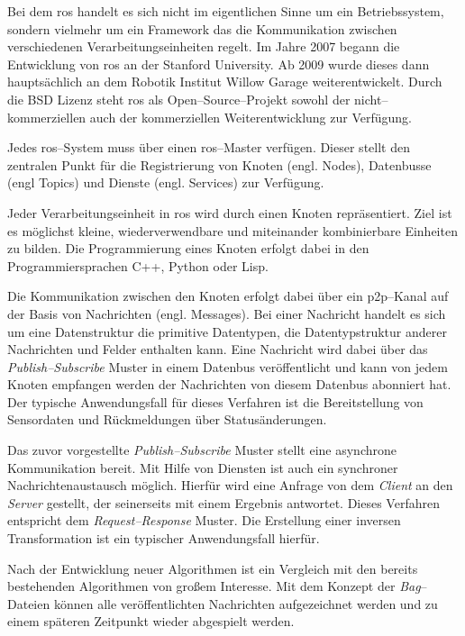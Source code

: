 Bei dem \Gls{ros} handelt es sich nicht im eigentlichen Sinne um ein Betriebssystem, sondern vielmehr um ein Framework das die Kommunikation zwischen verschiedenen Verarbeitungseinheiten regelt. Im Jahre 2007 begann die Entwicklung von \Gls{ros} an der Stanford University. Ab 2009 wurde dieses dann hauptsächlich an dem Robotik Institut Willow Garage weiterentwickelt. Durch die BSD Lizenz steht \Gls{ros} als Open--Source--Projekt sowohl der nicht--kommerziellen auch der kommerziellen Weiterentwicklung zur Verfügung. \cite{quigley2009ros}

Jedes \Gls{ros}--System muss über einen \Gls{ros}--Master verfügen. Dieser stellt den zentralen Punkt für die Registrierung von Knoten (engl. Nodes), Datenbusse (engl Topics) und Dienste (engl. Services) zur Verfügung.

Jeder Verarbeitungseinheit in \Gls{ros} wird durch einen Knoten repräsentiert. Ziel ist es möglichst kleine, wiederverwendbare und miteinander kombinierbare Einheiten zu bilden. Die Programmierung eines Knoten erfolgt dabei in den Programmiersprachen C++, Python oder Lisp.

Die Kommunikation zwischen den Knoten erfolgt dabei über ein \Gls{p2p}--Kanal auf der Basis von Nachrichten (engl. Messages). Bei einer Nachricht handelt es sich um eine Datenstruktur die primitive Datentypen, die Datentypstruktur anderer Nachrichten und Felder enthalten kann. Eine Nachricht wird dabei über das \textit{Publish--Subscribe} Muster in einem Datenbus veröffentlicht und kann von jedem Knoten empfangen werden der Nachrichten von diesem Datenbus abonniert hat. Der typische Anwendungsfall für dieses Verfahren ist die Bereitstellung von Sensordaten und Rückmeldungen über Statusänderungen.

Das zuvor vorgestellte \textit{Publish--Subscribe} Muster stellt eine asynchrone Kommunikation bereit. Mit Hilfe von Diensten ist auch ein synchroner Nachrichtenaustausch möglich. Hierfür wird eine Anfrage von dem \textit{Client} an den \textit{Server} gestellt, der seinerseits mit einem Ergebnis antwortet. Dieses Verfahren entspricht dem \textit{Request--Response} Muster. Die Erstellung einer inversen Transformation ist ein typischer Anwendungsfall hierfür.

Nach der Entwicklung neuer Algorithmen ist ein Vergleich mit den bereits bestehenden Algorithmen von großem Interesse. Mit dem Konzept der \textit{Bag}--Dateien können alle veröffentlichten Nachrichten aufgezeichnet werden und zu einem späteren Zeitpunkt wieder abgespielt werden.

